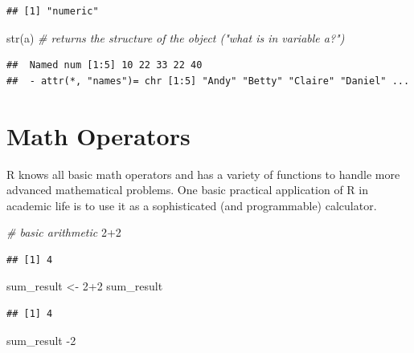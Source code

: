 \documentclass[
  12pt,
]{style/krantz}
\newenvironment{Shaded}{\begin{snugshade}}{\end{snugshade}}
\newcommand{\CommentTok}[1]{\textcolor[rgb]{0.56,0.35,0.01}{\textit{#1}}}
\newcommand{\DecValTok}[1]{\textcolor[rgb]{0.00,0.00,0.81}{#1}}
\newcommand{\FunctionTok}[1]{\textcolor[rgb]{0.00,0.00,0.00}{#1}}
\newcommand{\NormalTok}[1]{#1}
\newcommand{\OtherTok}[1]{\textcolor[rgb]{0.56,0.35,0.01}{#1}}
\newcommand{\SpecialCharTok}[1]{\textcolor[rgb]{0.00,0.00,0.00}{#1}}
\begin{document}
\begin{verbatim}
## [1] "numeric"
\end{verbatim}

\begin{Shaded}
\begin{Highlighting}[]
\FunctionTok{str}\NormalTok{(a) }\CommentTok{\# returns the structure of the object ("what is in variable a?")}
\end{Highlighting}
\end{Shaded}

\begin{verbatim}
##  Named num [1:5] 10 22 33 22 40
##  - attr(*, "names")= chr [1:5] "Andy" "Betty" "Claire" "Daniel" ...
\end{verbatim}

\hypertarget{math-operators}{%
\section{Math Operators}\label{math-operators}}

R knows all basic math operators and has a variety of functions to handle more advanced mathematical problems. One basic practical application of R in academic life is to use it as a sophisticated (and programmable) calculator.

\begin{Shaded}
\begin{Highlighting}[]
\CommentTok{\# basic arithmetic }
\DecValTok{2}\SpecialCharTok{+}\DecValTok{2}
\end{Highlighting}
\end{Shaded}

\begin{verbatim}
## [1] 4
\end{verbatim}

\begin{Shaded}
\begin{Highlighting}[]
\NormalTok{sum\_result }\OtherTok{\textless{}{-}} \DecValTok{2}\SpecialCharTok{+}\DecValTok{2}
\NormalTok{sum\_result}
\end{Highlighting}
\end{Shaded}

\begin{verbatim}
## [1] 4
\end{verbatim}

\begin{Shaded}
\begin{Highlighting}[]
\NormalTok{sum\_result }\SpecialCharTok{{-}}\DecValTok{2}
\end{Highlighting}
\end{Shaded}
\end{document}
